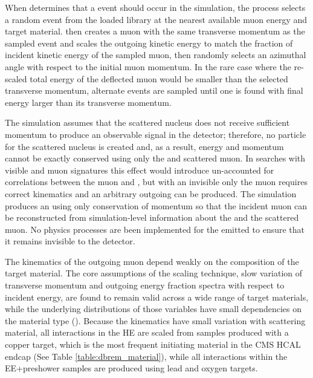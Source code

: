 When \gf determines that a \dbrem event should occur in the simulation, the process selects a random event from the loaded \mg library at the nearest available muon energy and target material. 
\gf then creates a muon with the same transverse momentum as the sampled event and scales the outgoing kinetic energy to match the fraction of incident kinetic energy of the sampled muon, then randomly selects an azimuthal angle with respect to the initial muon momentum. 
In the rare case where the re-scaled total energy of the deflected muon would be smaller than the selected transverse momentum, alternate events are sampled until one is found with final energy larger than its transverse momentum. 

The simulation assumes that the scattered nucleus does not receive sufficient momentum to produce an observable signal in the detector; therefore, no \gf particle for the scattered nucleus is created and, as a result, energy and momentum cannot be exactly conserved using only the \aprime and scattered muon. 
In searches with visible \aprime and muon signatures this effect would introduce un-accounted for correlations between the muon and \aprime, but with an invisible \aprime only the muon requires correct kinematics and an arbitrary outgoing \aprime can be produced.  
The simulation produces an \aprime using only conservation of momentum so that the incident muon can be reconstructed from simulation-level information about the \aprime and the scattered muon.
No physics processes are been implemented for the emitted \aprime to ensure that it remains invisible to the detector.

The kinematics of the outgoing muon depend weakly on the composition of the target material.
The core assumptions of the scaling technique, slow variation of transverse momentum and outgoing energy fraction spectra with respect to incident energy, are found to remain valid across a wide range of target materials, while the underlying distributions of those variables have small dependencies on the material type ().
Because the kinematics have small variation with scattering material, all \dbrem interactions in the HE are scaled from samples produced with a copper target, which is the most frequent \dbrem initiating material in the CMS HCAL endcap (See Table \ref{table:dbrem_material}), while all interactions within the EE+preshower samples are produced using lead and oxygen targets.

